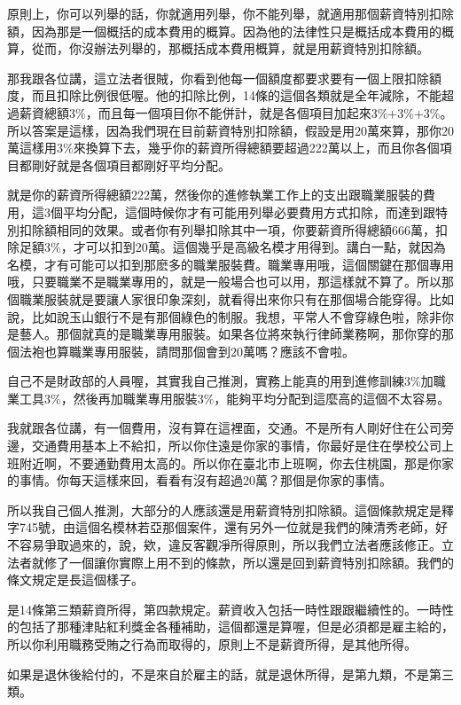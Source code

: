 \documentclass[oneside,sub3section]{ctexbook}
\begin{document}
原則上，你可以列舉的話，你就適用列舉，你不能列舉，就適用那個薪資特別扣除額，因為那是一個概括的成本費用的概算。因為他的法律性只是概括成本費用的概算，從而，你沒辦法列舉的，那概括成本費用概算，就是用薪資特別扣除額。

那我跟各位講，這立法者很賊，你看到他每一個額度都要求要有一個上限扣除額度，而且扣除比例很低喔。他的扣除比例，14條的這個各類就是全年減除，不能超過薪資總額3\%，而且每一個項目你不能併計，就是各個項目加起來3\%+3\%+3\%。所以答案是這樣，因為我們現在目前薪資特別扣除額，假設是用20萬來算，那你20萬這樣用3\%來換算下去，幾乎你的薪資所得總額要超過222萬以上，而且你各個項目都剛好就是各個項目都剛好平均分配。

就是你的薪資所得總額222萬，然後你的進修執業工作上的支出跟職業服裝的費用，這3個平均分配，這個時候你才有可能用列舉必要費用方式扣除，而達到跟特別扣除額相同的效果。或者你有列舉扣除其中一項，你要薪資所得總額666萬，扣除足額3\%，才可以扣到20萬。這個幾乎是高級名模才用得到。講白一點，就因為名模，才有可能可以扣到那麽多的職業服裝費。職業專用哦，這個關鍵在那個專用哦，只要職業不是職業專用的，就是一般場合也可以用，那這樣就不算了。所以那個職業服裝就是要讓人家很印象深刻，就看得出來你只有在那個場合能穿得。比如說，比如說玉山銀行不是有那個綠色的制服。我想，平常人不會穿綠色啦，除非你是藝人。那個就真的是職業專用服裝。如果各位將來執行律師業務啊，那你穿的那個法袍也算職業專用服裝，請問那個會到20萬嗎？應該不會啦。

自己不是財政部的人員喔，其實我自己推測，實務上能真的用到進修訓練3\%加職業工具3\%，然後再加職業專用服裝3\%，能夠平均分配到這麼高的這個不太容易。

我就跟各位講，有一個費用，沒有算在這裡面，交通。不是所有人剛好住在公司旁邊，交通費用基本上不給扣，所以你住遠是你家的事情，你最好是住在學校公司上班附近啊，不要通勤費用太高的。所以你在臺北市上班啊，你去住桃園，那是你家的事情。你每天這樣來回，看看有沒有超過20萬？那個是你家的事情。

所以我自己個人推測，大部分的人應該還是用薪資特別扣除額。這個條款規定是釋字745號，由這個名模林若亞那個案件，還有另外一位就是我們的陳清秀老師，好不容易爭取過來的，說，欸，違反客觀凈所得原則，所以我們立法者應該修正。立法者就修了一個讓你實際上用不到的條款，所以還是回到薪資特別扣除額。我們的條文規定是長這個樣子。

是14條第三類薪資所得，第四款規定。薪資收入包括一時性跟跟繼續性的。一時性的包括了那種津貼紅利獎金各種補助，這個都還是算喔，但是必須都是雇主給的，所以你利用職務受賄之行為而取得的，原則上不是薪資所得，是其他所得。

如果是退休後給付的，不是來自於雇主的話，就是退休所得，是第九類，不是第三類。
\end{document}
